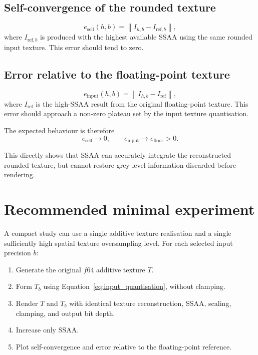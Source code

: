 \documentclass[11pt,a4paper]{article}
\begin{document}
\subsection*{Self-convergence of the rounded texture}
\begin{equation}
    e_{\mathrm{self}}(h,b)
    = \left\|I_{h,b}-I_{\mathrm{ref},b}\right\|,
\end{equation}
where $I_{\mathrm{ref},b}$ is produced with the highest available SSAA using the same rounded input texture. This error should tend to zero.

\subsection*{Error relative to the floating-point texture}
\begin{equation}
    e_{\mathrm{input}}(h,b)
    = \left\|I_{h,b}-I_{\mathrm{ref}}\right\|,
\end{equation}
where $I_{\mathrm{ref}}$ is the high-SSAA result from the original floating-point texture. This error should approach a non-zero plateau set by the input texture quantisation.

The expected behaviour is therefore
\begin{equation}
    e_{\mathrm{self}} \rightarrow 0,
    \qquad
    e_{\mathrm{input}} \rightarrow e_{\mathrm{floor}} > 0.
\end{equation}

This directly shows that SSAA can accurately integrate the reconstructed rounded texture, but cannot restore grey-level information discarded before rendering.

\section{Recommended minimal experiment}

A compact study can use a single additive texture realisation and a single sufficiently high spatial texture oversampling level. For each selected input precision $b$:

\begin{enumerate}
    \item Generate the original $f64$ additive texture $T$.
    \item Form $T_b$ using Equation~\eqref{eq:input_quantisation}, without clamping.
    \item Render $T$ and $T_b$ with identical texture reconstruction, SSAA, scaling, clamping, and output bit depth.
    \item Increase only SSAA.
    \item Plot self-convergence and error relative to the floating-point reference.
\end{enumerate}
\end{document}
